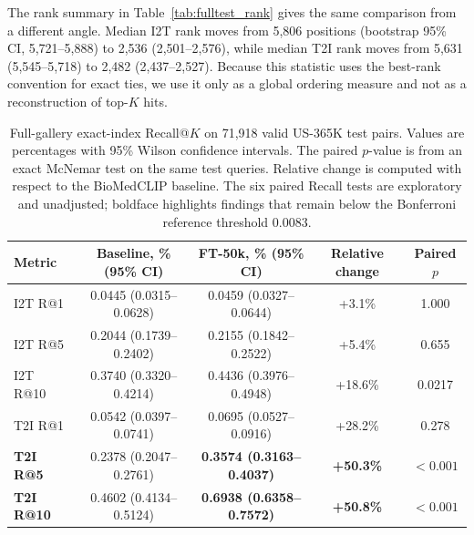 \documentclass[runningheads]{llncs}
\begin{document}
The rank summary in Table~\ref{tab:fulltest_rank} gives the same comparison from a different angle. Median I2T rank moves from 5,806 positions (bootstrap 95\% CI, 5,721--5,888) to 2,536 (2,501--2,576), while median T2I rank moves from 5,631 (5,545--5,718) to 2,482 (2,437--2,527). Because this statistic uses the best-rank convention for exact ties, we use it only as a global ordering measure and not as a reconstruction of top-$K$ hits.

\begin{table}[t]
\caption{Full-gallery exact-index Recall@$K$ on 71,918 valid US-365K test pairs. Values are percentages with 95\% Wilson confidence intervals. The paired $p$-value is from an exact McNemar test on the same test queries. Relative change is computed with respect to the BioMedCLIP baseline. The six paired Recall tests are exploratory and unadjusted; boldface highlights findings that remain below the Bonferroni reference threshold $0.0083$.}
\label{tab:fulltest_recall}
\centering
\scriptsize
\setlength{\tabcolsep}{3.8pt}
\begin{tabular}{@{}lcccc@{}}
\toprule
\textbf{Metric} & \textbf{Baseline, \% (95\% CI)} & \textbf{FT-50k, \% (95\% CI)} & \textbf{Relative change} & \textbf{Paired $p$} \\
\midrule
I2T R@1 & 0.0445 (0.0315--0.0628) & 0.0459 (0.0327--0.0644) & +3.1\% & 1.000 \\
I2T R@5 & 0.2044 (0.1739--0.2402) & 0.2155 (0.1842--0.2522) & +5.4\% & 0.655 \\
I2T R@10 & 0.3740 (0.3320--0.4214) & 0.4436 (0.3976--0.4948) & +18.6\% & 0.0217 \\
T2I R@1 & 0.0542 (0.0397--0.0741) & 0.0695 (0.0527--0.0916) & +28.2\% & 0.278 \\
\textbf{T2I R@5} & 0.2378 (0.2047--0.2761) & \textbf{0.3574 (0.3163--0.4037)} & \textbf{+50.3\%} & \textbf{$<0.001$} \\
\textbf{T2I R@10} & 0.4602 (0.4134--0.5124) & \textbf{0.6938 (0.6358--0.7572)} & \textbf{+50.8\%} & \textbf{$<0.001$} \\
\bottomrule
\end{tabular}
\end{table}
\end{document}
